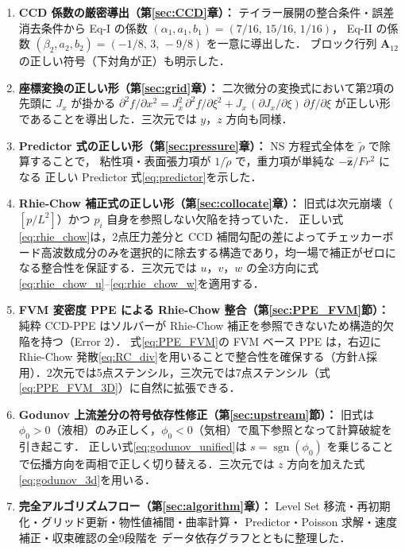 \documentclass[12pt, a4paper, titlepage]{article}
\newcommand{\jp}[1]{{\normalfont\jpfont #1}}
\begin{document}
\begin{enumerate}[leftmargin=2em, itemsep=4pt]

  \item \jp{\textbf{CCD 係数の厳密導出（第\ref{sec:CCD}章）：}
        テイラー展開の整合条件・誤差消去条件から Eq-I の係数
        $(\alpha_1,a_1,b_1)=(7/16,\,15/16,\,1/16)$，
        Eq-II の係数 $(\beta_2,a_2,b_2)=(-1/8,\,3,\,-9/8)$ を一意に導出した．
        ブロック行列 $\bm{A}_{12}$ の正しい符号（下対角が正）も明示した．}

  \item \jp{\textbf{座標変換の正しい形（第\ref{sec:grid}章）：}
        二次微分の変換式において第2項の先頭に $J_x$ が掛かる
        $\partial^2 f/\partial x^2 = J_x^2\,\partial^2 f/\partial\xi^2
        + J_x\,(\partial J_x/\partial\xi)\,\partial f/\partial\xi$
        が正しい形であることを導出した．三次元では $y$，$z$ 方向も同様．}

  \item \jp{\textbf{Predictor 式の正しい形（第\ref{sec:pressure}章）：}
        NS 方程式全体を $\tilde\rho$ で除算することで，
        粘性項・表面張力項が $1/\tilde\rho$ で，重力項が単純な $-\hat{\bm{z}}/Fr^2$ になる
        正しい Predictor 式\eqref{eq:predictor}を示した．}

  \item \jp{\textbf{Rhie-Chow 補正式の正しい形（第\ref{sec:collocate}章）：}
        旧式は次元崩壊（$[p/L^2]$）かつ $p_i$ 自身を参照しない欠陥を持っていた．
        正しい式\eqref{eq:rhie_chow}は，2点圧力差分と CCD 補間勾配の差によってチェッカーボード高波数成分のみを選択的に除去する構造であり，均一場で補正がゼロになる整合性を保証する．三次元では $u$，$v$，$w$ の全3方向に式\eqref{eq:rhie_chow_u}--\eqref{eq:rhie_chow_w}を適用する．}

  \item \jp{\textbf{FVM 変密度 PPE による Rhie-Chow 整合（第\ref{sec:PPE_FVM}節）：}
        純粋 CCD-PPE はソルバーが Rhie-Chow 補正を参照できないため構造的欠陥を持つ（Error 2）．
        式\eqref{eq:PPE_FVM}の FVM ベース PPE は，右辺に Rhie-Chow 発散\eqref{eq:RC_div}を用いることで整合性を確保する（方針A採用）．2次元では5点ステンシル，三次元では7点ステンシル（式\eqref{eq:PPE_FVM_3D}）に自然に拡張できる．}

  \item \jp{\textbf{Godunov 上流差分の符号依存性修正（第\ref{sec:upstream}節）：}
        旧式は $\phi_0 > 0$（液相）のみ正しく，$\phi_0 < 0$（気相）で風下参照となって計算破綻を引き起こす．
        正しい式\eqref{eq:godunov_unified}は $s=\operatorname{sgn}(\phi_0)$ を乗じることで伝播方向を両相で正しく切り替える．三次元では $z$ 方向を加えた式\eqref{eq:godunov_3d}を用いる．}

  \item \jp{\textbf{完全アルゴリズムフロー（第\ref{sec:algorithm}章）：}
        Level Set 移流・再初期化・グリッド更新・物性値補間・曲率計算・
        Predictor・Poisson 求解・速度補正・収束確認の全9段階を
        データ依存グラフとともに整理した．}

\end{enumerate}
\end{document}
